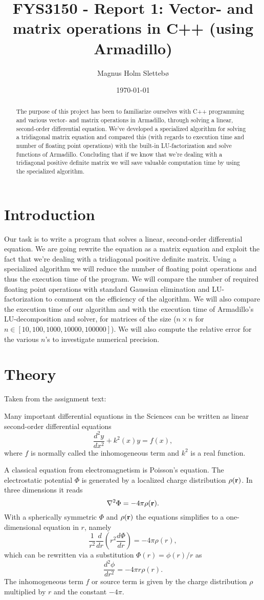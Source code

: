 \documentclass[norsk,a4paper,12pt]{article}
\title{FYS3150 - Report 1: Vector- and matrix operations in C++ (using Armadillo)}
\author{Magnus Holm Slettebø}
\date{\today}
\begin{document}
\maketitle

\begin{abstract}
The purpose of this project has been to familiarize ourselves with C++ programming and various vector- and matrix operations in Armadillo, through solving a linear, second-order differential equation. We've developed a specialized algorithm for solving a tridiagonal matrix equation and compared this (with regards to execution time and number of floating point operations) with the built-in LU-factorization and solve functions of Armadillo. Concluding that if we know that we're dealing with a tridiagonal positive definite matrix we will save valuable computation time by using the specialized algorithm.
\end{abstract}


\section{Introduction}
Our task is to write a program that solves a linear, second-order differential equation. We are going rewrite the equation as a matrix equation and exploit the fact that we're dealing with a tridiagonal positive definite matrix. Using a specialized algorithm we will reduce the number of floating point operations and thus the execution time of the program. We will compare the number of required floating point operations with standard Gaussian elimination and LU-factorization to comment on the efficiency of the algorithm. We will also compare the execution time of our algorithm and with the execution time of Armadillo's LU-decomposition and solver, for matrices of the size ($n \times n$ for $n \in [10,100,1000,10000,100000]$). We will also compute the relative error for the various $n$'s to investigate numerical precision.


\section{Theory}
Taken from the assignment text:

Many important differential equations in the Sciences can be written as 
linear second-order differential equations 
\[
\frac{d^2y}{dx^2}+k^2(x)y = f(x),
\]
where $f$ is normally called the inhomogeneous term and $k^2$ is a real function.

A classical equation from electromagnetism is Poisson's equation.
The electrostatic potential $\Phi$ is generated by a localized charge
distribution $\rho ({\bf r})$.   In three dimensions 
it reads
\[
\nabla^2 \Phi = -4\pi \rho ({\bf r}).
\]
With a spherically symmetric $\Phi$ and $\rho ({\bf r})$  the equations
simplifies to a one-dimensional equation in $r$, namely
\[
\frac{1}{r^2}\frac{d}{dr}\left(r^2\frac{d\Phi}{dr}\right) = -4\pi \rho(r),
\]
which can be rewritten via a substitution $\Phi(r)= \phi(r)/r$ as
\[
\frac{d^2\phi}{dr^2}= -4\pi r\rho(r).
\]
The inhomogeneous term $f$ or source term is given by the charge distribution
$\rho$  multiplied by $r$ and the constant $-4\pi$.
\end{document}
